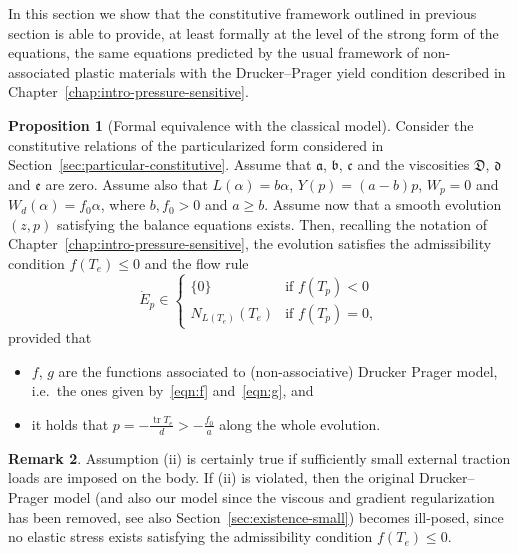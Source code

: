 \documentclass[a4paper,10pt,twoside]{amsbook}
\numberwithin{section}{chapter}
\numberwithin{equation}{chapter}
\theoremstyle{definition}
\newtheorem{prop}{Proposition}[chapter]
\newtheorem{rmk}[prop]{Remark}
\DeclareMathOperator{\tr}{tr}
\begin{document}
In this section we show that the constitutive framework outlined in previous section is able to provide, at least formally at the level of the strong form of the equations, the same equations predicted by the usual framework of non-associated plastic materials with the Drucker--Prager yield condition described in Chapter~\ref{chap:intro-pressure-sensitive}.
\begin{prop}[Formal equivalence with the classical model]
\label{prop:recovering}
Consider the constitutive relations of the particularized form considered in Section~\ref{sec:particular-constitutive}. Assume that $\mathfrak{a}$, $\mathfrak{b}$, $\mathfrak{c}$ and the viscosities $\mathfrak{D}$, $\mathfrak{d}$ and $\mathfrak{e}$ are zero. Assume also that $L(\alpha)=b\alpha$, $Y(p)=(a-b)p$, $W_p=0$ and $W_d(\alpha)=f_0\alpha$, where $b,f_0>0$ and $a\ge b$.  Assume now that a smooth evolution $(z,p)$ satisfying the balance equations exists. Then, recalling the notation of Chapter~\ref{chap:intro-pressure-sensitive}, the evolution satisfies the admissibility condition $f(T_e)\le0$ and the flow rule
\[
\dot E_p\in
\begin{cases}
\{0\} & \text{if $f(T_p)<0$} \\
N_{L(T_e)}(T_e) & \text{if $f(T_p)=0$},
\end{cases}
\]
provided that
\begin{itemize}
\item[(i)] $f$, $g$ are the functions associated to (non-associative) Drucker Prager model, i.e.\ the ones given by~\eqref{eqn:f} and~\eqref{eqn:g}, and
\item[(ii)] it holds that $p=-\frac{\tr T_e}{d}>-\frac{f_0}{a}$ along the whole evolution.
\end{itemize}
\end{prop}
\begin{rmk}
Assumption (ii) is certainly true if sufficiently small external traction loads are imposed on the body. If (ii) is violated, then the original Drucker--Prager model (and also our model since the viscous and gradient regularization has been removed, see also Section~\ref{sec:existence-small}) becomes ill-posed, since no elastic stress exists satisfying the admissibility condition $f(T_e)\le0$. 
\end{rmk}
\end{document}
